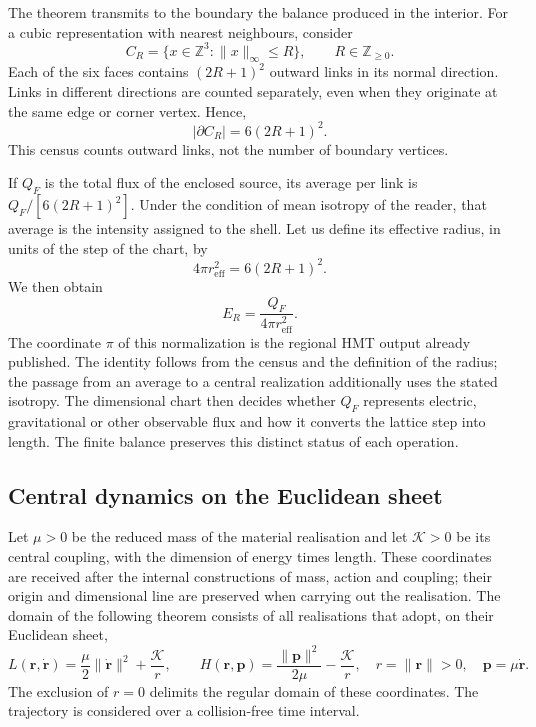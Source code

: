 The theorem transmits to the boundary the balance produced in the
interior. For a cubic representation with nearest neighbours,
consider
\[
 C_R=\{x\in\mathbb Z^3:\|x\|_\infty\leq R\},
 \qquad R\in\mathbb Z_{\geq0}.
\]
Each of the six faces contains $(2R+1)^2$ outward
links in its normal direction. Links in different
directions are counted separately, even when they originate at
the same edge or corner vertex. Hence,
\begin{equation}
 |\partial C_R|=6(2R+1)^2.
 \label{vi:vi:eq:frontera-cubica}
\end{equation}
This census counts outward links, not the number of
boundary vertices.

If $Q_F$ is the total flux of the enclosed source, its average
per link is $Q_F/[6(2R+1)^2]$. Under the condition of mean isotropy
of the reader, that average is the intensity assigned to the
shell. Let us define its effective radius, in units of the step of
the chart, by
\begin{equation}
 4\pi r_{\mathrm{eff}}^2=6(2R+1)^2.
 \label{vi:vi:eq:radio-efectivo}
\end{equation}
We then obtain
\begin{equation}
 E_R=\frac{Q_F}{4\pi r_{\mathrm{eff}}^2}.
 \label{vi:vi:eq:inverso-area}
\end{equation}
The coordinate $\pi$ of this normalization is the regional
HMT output already published. The identity follows from the census and the
definition of the radius; the passage from an average to a central
realization additionally uses the stated isotropy. The dimensional
chart then decides whether $Q_F$ represents electric,
gravitational or other observable flux and how it converts the lattice
step into length. The finite balance preserves this
distinct status of each operation.

\subsection{Central dynamics on the Euclidean sheet}
\label{vi:vi:subsec:dinamica-central}

Let $\mu>0$ be the reduced mass of the material realisation and let
$\mathcal K>0$ be its central coupling, with the dimension of
energy times length. These coordinates are received after
the internal constructions of mass, action and coupling;
their origin and dimensional line are preserved when carrying out the
realisation. The domain of the following theorem consists of all
realisations that adopt, on their Euclidean sheet,
\begin{equation}
 L(\mathbf r,\dot{\mathbf r})
 =\frac\mu2\|\dot{\mathbf r}\|^2+\frac{\mathcal K}{r},
 \qquad
 H(\mathbf r,\mathbf p)
 =\frac{\|\mathbf p\|^2}{2\mu}-\frac{\mathcal K}{r},
 \quad r=\|\mathbf r\|>0,
 \quad\mathbf p=\mu\dot{\mathbf r}.
 \label{vi:vi:eq:kepler-lh}
\end{equation}
The exclusion of $r=0$ delimits the regular domain of these
coordinates. The trajectory is considered over a collision-free
time interval.

